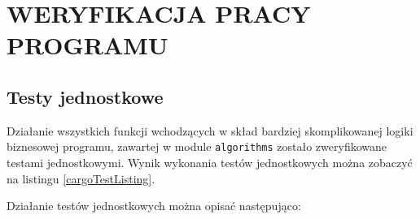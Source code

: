 \section{WERYFIKACJA PRACY PROGRAMU}
\label{testSection}

\subsection{Testy jednostkowe}

Działanie wszystkich funkcji wchodzących w skład bardziej skomplikowanej logiki
biznesowej programu, zawartej w module \verb|algorithms| zostało zweryfikowane
testami jednostkowymi. Wynik wykonania testów jednostkowych można zobaczyć na
listingu \ref{cargoTestListing}.



Działanie testów jednostkowych można opisać następująco:

